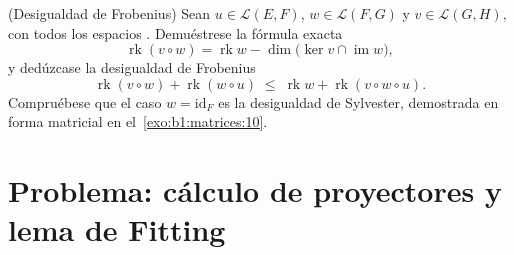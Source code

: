 \begin{exercise}[$\star\star\star$]\label{exo:b1:linmaps:12}
(Desigualdad de Frobenius) Sean $u \in \mathcal{L}(E, F)$,
$w \in \mathcal{L}(F, G)$ y $v \in \mathcal{L}(G, H)$, con todos los
espacios . Demuéstrese la fórmula exacta
\[
\operatorname{rk}(v \circ w) = \operatorname{rk} w -
\dim\bigl(\ker v \cap \operatorname{im} w\bigr),
\]
y dedúzcase la desigualdad de Frobenius
\[
\operatorname{rk}(v \circ w) + \operatorname{rk}(w \circ u)
\;\leq\; \operatorname{rk} w + \operatorname{rk}(v \circ w \circ
u) .
\]
Compruébese que el caso $w = \mathrm{id}_F$ es la desigualdad de
Sylvester, demostrada en forma matricial en el~\cref{exo:b1:matrices:10}.
\end{exercise}

\section{Problema: cálculo de proyectores y lema de Fitting}

